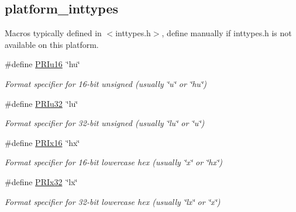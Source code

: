 \subsection*{platform\+\_\+inttypes}
\label{_amgrp35b931ac4659d850ad6bd5148751f3f6}%
Macros typically defined in $<$inttypes.\+h$>$, define manually if inttypes.\+h is not available on this platform. \begin{DoxyCompactItemize}
\item 
\mbox{\label{group__hal_ga86bc00ee87e8e40787e0681fc34c576a}} 
\#define \hyperlink{group__hal_ga86bc00ee87e8e40787e0681fc34c576a}{P\+R\+Iu16}~\char`\"{}hu\char`\"{}
\begin{DoxyCompactList}\small\item\em Format specifier for 16-\/bit unsigned (usually {\ttfamily \char`\"{}u\char`\"{}} or {\ttfamily \char`\"{}hu\char`\"{}}) \end{DoxyCompactList}\item 
\mbox{\label{group__hal_gaaf2af4a10f0bd308e9c349c8382382be}} 
\#define \hyperlink{group__hal_gaaf2af4a10f0bd308e9c349c8382382be}{P\+R\+Iu32}~\char`\"{}lu\char`\"{}
\begin{DoxyCompactList}\small\item\em Format specifier for 32-\/bit unsigned (usually {\ttfamily \char`\"{}lu\char`\"{}} or {\ttfamily \char`\"{}u\char`\"{}}) \end{DoxyCompactList}\item 
\mbox{\label{group__hal_ga70f5e38b517f714518c970a4da37bef1}} 
\#define \hyperlink{group__hal_ga70f5e38b517f714518c970a4da37bef1}{P\+R\+Ix16}~\char`\"{}hx\char`\"{}
\begin{DoxyCompactList}\small\item\em Format specifier for 16-\/bit lowercase hex (usually {\ttfamily \char`\"{}x\char`\"{}} or {\ttfamily \char`\"{}hx\char`\"{}}) \end{DoxyCompactList}\item 
\mbox{\label{group__hal_ga80ca66bcc9e366733f02c90ed4b0838c}} 
\#define \hyperlink{group__hal_ga80ca66bcc9e366733f02c90ed4b0838c}{P\+R\+Ix32}~\char`\"{}lx\char`\"{}
\begin{DoxyCompactList}\small\item\em Format specifier for 32-\/bit lowercase hex (usually {\ttfamily \char`\"{}lx\char`\"{}} or {\ttfamily \char`\"{}x\char`\"{}}) \end{DoxyCompactList}\item 

\end{DoxyCompactItemize}
